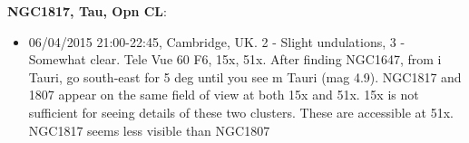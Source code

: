 {\bf NGC1817, Tau, Opn CL}:
\begin{itemize}
\item 06/04/2015 21:00-22:45, Cambridge, UK. 2 - Slight undulations, 3 - Somewhat clear. Tele Vue 60 F6, 15x, 51x. After finding NGC1647, from i Tauri, go south-east for 5 deg until you see m Tauri (mag 4.9). NGC1817 and 1807 appear on the same field of view at both 15x and 51x. 15x is not sufficient for seeing details of these two clusters. These are accessible at 51x. NGC1817 seems less visible than NGC1807
\end{itemize}

